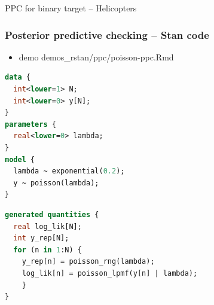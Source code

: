 \documentclass[t]{beamer}
\begin{document}
\begin{frame}[fragile]{PPC for binary target -- Helicopters}
  
\end{frame}


  
\begin{frame}[fragile]
  \frametitle{Posterior predictive checking -- Stan code}

  \vspace{-0.2\parskip}
  \begin{itemize}
  \item demo demos\_rstan/ppc/poisson-ppc.Rmd
  \end{itemize}

  \vspace{-0.2\parskip}
  {\color{gray}\footnotesize
\begin{lstlisting}[language=Stan]
data {
  int<lower=1> N;
  int<lower=0> y[N];
}
parameters {
  real<lower=0> lambda;
}
model {
  lambda ~ exponential(0.2);
  y ~ poisson(lambda);
}
\end{lstlisting}
  }
  \vspace{-\parskip}
  {\footnotesize
\begin{lstlisting}[language=Stan]
generated quantities {
  real log_lik[N];
  int y_rep[N];
  for (n in 1:N) {
    y_rep[n] = poisson_rng(lambda);
    log_lik[n] = poisson_lpmf(y[n] | lambda);
    }
}
\end{lstlisting}
 }
\end{frame}
\end{document}
